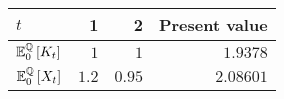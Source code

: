 \documentclass[main.tex]{subfiles}
\begin{document}
            \begin{table}[H]
                \centering
                \begin{tabular}{l|rr||r}
                    $t$ & 1 & 2 & Present value \\
                    \hline
                    \rule{0pt}{1.1em}
                    $\mathbb{E}_{0}^{\mathbb{Q}}\left[K_t\right]$ & $\num{1}$ & $\num{1}$ & $\num{1.9378}$ \\
                    \rule{0pt}{1.1em}
                    $\mathbb{E}_{0}^{\mathbb{Q}}\left[X_t\right]$ & $\num{1.2}$ & $\num{0.95}$ & $\num{2.08601}$ \\
                \end{tabular}
                \caption{}
                \label{tbl:swap-legs}
            \end{table}
\end{document}
